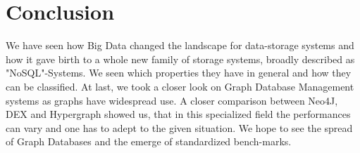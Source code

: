 \documentclass{acm_proc_article-sp}
\begin{document}
\section{Conclusion}

We have seen how Big Data changed the landscape for data-storage systems and how it gave birth to a whole new family of storage systems, broadly described as "NoSQL"-Systems. We seen which properties they have in general and how they can be classified. At last, we took a closer look on Graph Database Management systems as graphs have widespread use. A closer comparison between Neo4J, DEX and Hypergraph showed us, that in this specialized field the performances can vary and one has to adept to the given situation. We hope to see the spread of Graph Databases and the emerge of standardized bench-marks.


%

%
%
\end{document}
